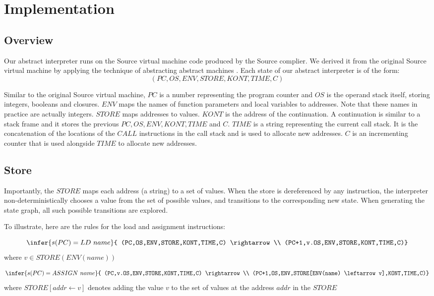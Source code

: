\documentclass[12pt]{article}
\begin{document}
\section{Implementation}
\subsection{Overview}
Our abstract interpreter runs on the Source virtual machine code produced by the Source complier. We derived it from the original Source virtual machine by applying the technique of abstracting abstract machines \cite{aam}. Each state of our abstract interpreter is of the form:
$$(PC,OS,ENV,STORE,KONT,TIME,C)$$

Similar to the original Source virtual machine, $PC$ is a number representing the program counter and $OS$ is the operand stack itself, storing integers, booleans and closures. $ENV$ maps the names of function parameters and local variables to addresses. Note that these names in practice are actually integers. $STORE$ maps addresses to values. $KONT$ is the address of the continuation. A continuation is similar to a stack frame and it stores the previous $PC,OS,ENV,KONT,TIME$ and $C$. $TIME$ is a string representing the current call stack. It is the concatenation of the locations of the $CALL$ instructions in the call stack and is used to allocate new addresses. $C$ is an incrementing counter that is used alongside $TIME$ to allocate new addresses.

\subsection{Store}
Importantly, the $STORE$ maps each address (a string) to a set of values. When the store is dereferenced by any instruction, the interpreter non-deterministically chooses a value from the set of possible values, and transitions to the corresponding new state. When generating the state graph, all such possible transitions are explored.

To illustrate, here are the rules for the load and assignment instructions:

$$\infer{s(PC) = LD\ name}{
    (PC,OS,ENV,STORE,KONT,TIME,C) \rightarrow \\
    (PC+1,v.OS,ENV,STORE,KONT,TIME,C)}$$
where $v \in STORE(ENV(name))$

$$\infer{s(PC) = ASSIGN\ name}{
  (PC,v.OS,ENV,STORE,KONT,TIME,C) \rightarrow \\
  (PC+1,OS,ENV,STORE[ENV(name) \leftarrow v],KONT,TIME,C)}$$
where $STORE[addr \leftarrow v]$ denotes adding the value $v$ to the set of values at the address $addr$ in the $STORE$
\end{document}
